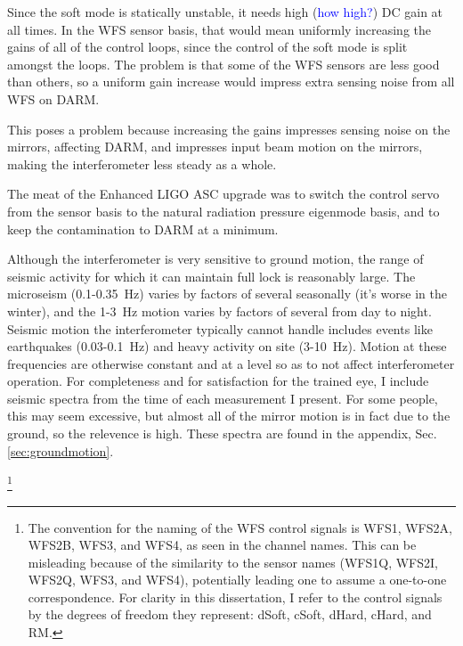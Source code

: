 Since the soft mode is statically unstable, it needs high
(\textcolor{blue}{how high?}) DC gain at all times. In the WFS sensor
basis, that would mean uniformly increasing the gains of all of the
control loops, since the control of the soft mode is split amongst the
loops. The problem is that some of the WFS sensors are less good than
others, so a uniform gain increase would impress extra sensing noise
from all WFS on DARM. 

This poses a problem because increasing the gains impresses
sensing noise on the mirrors, affecting DARM, and impresses input beam
motion on the mirrors, making the interferometer less steady as a whole.

The meat of the Enhanced LIGO ASC upgrade was to switch the control servo
from the sensor basis to the natural radiation pressure eigenmode
basis, and to keep the contamination to DARM at a minimum. 


Although the interferometer is very sensitive to ground motion, the
range of seismic activity for which it can maintain full lock is
reasonably large. The microseism (0.1-0.35~Hz) varies by factors of
several seasonally (it's worse in the winter), and the 1-3~Hz motion
varies by factors of several from day to night. Seismic motion the
interferometer typically cannot handle includes events like
earthquakes (0.03-0.1~Hz) and heavy activity on site (3-10~Hz). Motion
at these frequencies are otherwise constant and at a level so as to
not affect interferometer operation. For completeness and for
satisfaction for the trained eye, I include seismic spectra from the
time of each measurement I present. For some people, this may seem
excessive, but almost all of the mirror motion is in fact due to the
ground, so the relevence is high. These spectra are found in the
appendix, Sec. \ref{sec:groundmotion}.


\footnote{The convention for the naming of the WFS control signals is
  WFS1, WFS2A, WFS2B, WFS3, and WFS4, as seen in the channel
  names. This can be misleading because of the similarity to the
  sensor names (WFS1Q, WFS2I, WFS2Q, WFS3, and WFS4), potentially
  leading one to assume a one-to-one correspondence. For clarity in
  this dissertation, I refer to the control signals by the degrees of
  freedom they represent: dSoft, cSoft, dHard, cHard, and RM.}





